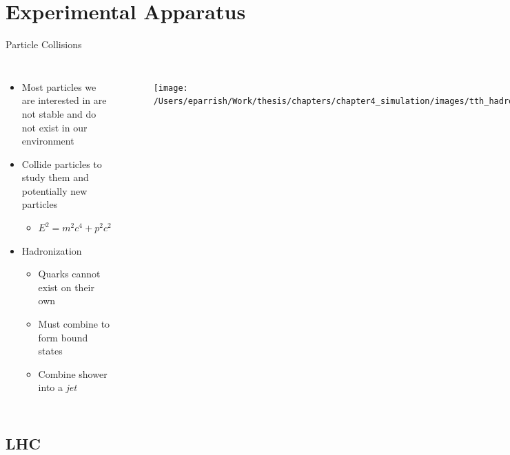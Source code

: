 \documentclass[aspectratio=169,xcolor=table]{beamer}
\begin{document}
\section{Experimental Apparatus }

  \begin{frame}[t]{Particle Collisions}
    \begin{columns}[t]
        \begin{itemize}
          \item Most particles we are interested in are not stable and do not exist in our environment
          \item Collide particles to study them and potentially new particles
            \begin{itemize}
              \item $E^2 = m^2c^4 + p^2c^2$
            \end{itemize}
          \item Hadronization
          \begin{itemize}
            \item Quarks cannot exist on their own
            \item Must combine to form bound states
            \item Combine shower into a \textit{jet}
          \end{itemize}
        \end{itemize}

        \begin{figure}
        \centering
        \texttt{[image: /Users/eparrish/Work/thesis/chapters/chapter4\_simulation/images/tth\_hadronization\_gen.png]}
        \caption{\tiny \cite{Wanotayaroj:2242196}}
        \end{figure}

    \end{columns}
  \end{frame}

  \subsection{LHC }
\end{document}

